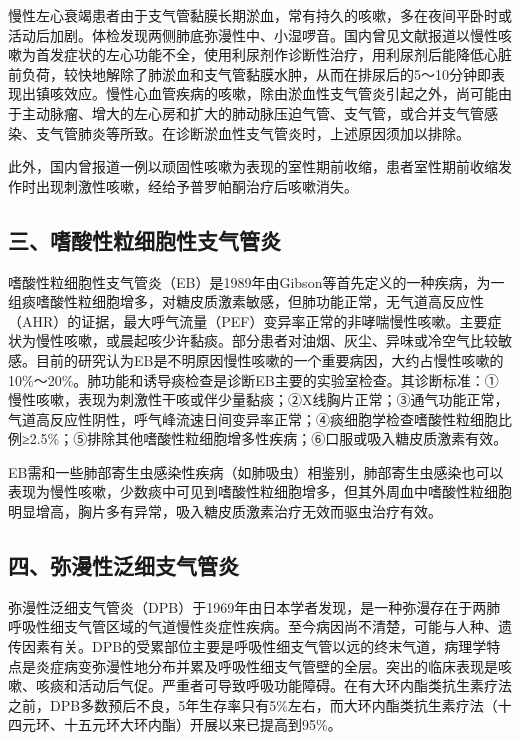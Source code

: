 慢性左心衰竭患者由于支气管黏膜长期淤血，常有持久的咳嗽，多在夜间平卧时或活动后加剧。体检发现两侧肺底弥漫性中、小湿啰音。国内曾见文献报道以慢性咳嗽为首发症状的左心功能不全，使用利尿剂作诊断性治疗，用利尿剂后能降低心脏前负荷，较快地解除了肺淤血和支气管黏膜水肿，从而在排尿后的5～10分钟即表现出镇咳效应。慢性心血管疾病的咳嗽，除由淤血性支气管炎引起之外，尚可能由于主动脉瘤、增大的左心房和扩大的肺动脉压迫气管、支气管，或合并支气管感染、支气管肺炎等所致。在诊断淤血性支气管炎时，上述原因须加以排除。

此外，国内曾报道一例以顽固性咳嗽为表现的室性期前收缩，患者室性期前收缩发作时出现刺激性咳嗽，经给予普罗帕酮治疗后咳嗽消失。

\subsection{三、嗜酸性粒细胞性支气管炎}

嗜酸性粒细胞性支气管炎（EB）是1989年由Gibson等首先定义的一种疾病，为一组痰嗜酸性粒细胞增多，对糖皮质激素敏感，但肺功能正常，无气道高反应性（AHR）的证据，最大呼气流量（PEF）变异率正常的非哮喘慢性咳嗽。主要症状为慢性咳嗽，或晨起咳少许黏痰。部分患者对油烟、灰尘、异味或冷空气比较敏感。目前的研究认为EB是不明原因慢性咳嗽的一个重要病因，大约占慢性咳嗽的10\%～20\%。肺功能和诱导痰检查是诊断EB主要的实验室检查。其诊断标准：①慢性咳嗽，表现为刺激性干咳或伴少量黏痰；②X线胸片正常；③通气功能正常，气道高反应性阴性，呼气峰流速日间变异率正常；④痰细胞学检查嗜酸性粒细胞比例≥2.5\%；⑤排除其他嗜酸性粒细胞增多性疾病；⑥口服或吸入糖皮质激素有效。

EB需和一些肺部寄生虫感染性疾病（如肺吸虫）相鉴别，肺部寄生虫感染也可以表现为慢性咳嗽，少数痰中可见到嗜酸性粒细胞增多，但其外周血中嗜酸性粒细胞明显增高，胸片多有异常，吸入糖皮质激素治疗无效而驱虫治疗有效。

\subsection{四、弥漫性泛细支气管炎}

弥漫性泛细支气管炎（DPB）于1969年由日本学者发现，是一种弥漫存在于两肺呼吸性细支气管区域的气道慢性炎症性疾病。至今病因尚不清楚，可能与人种、遗传因素有关。DPB的受累部位主要是呼吸性细支气管以远的终末气道，病理学特点是炎症病变弥漫性地分布并累及呼吸性细支气管壁的全层。突出的临床表现是咳嗽、咳痰和活动后气促。严重者可导致呼吸功能障碍。在有大环内酯类抗生素疗法之前，DPB多数预后不良，5年生存率只有5\%左右，而大环内酯类抗生素疗法（十四元环、十五元环大环内酯）开展以来已提高到95\%。

